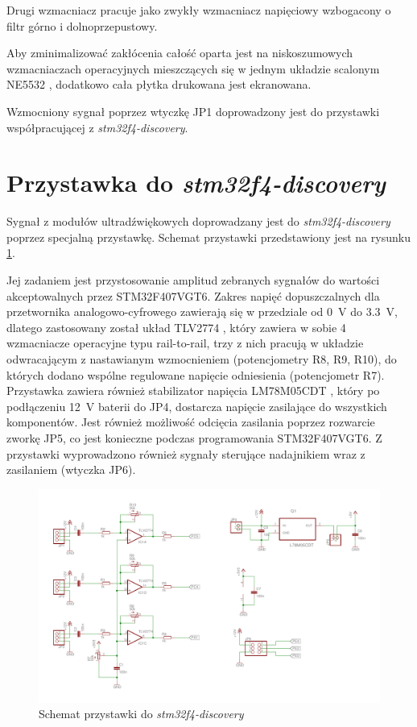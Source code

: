 Drugi wzmacniacz pracuje jako zwykły wzmacniacz napięciowy wzbogacony o filtr górno i dolnoprzepustowy.

Aby zminimalizować zakłócenia całość oparta jest na niskoszumowych wzmacniaczach operacyjnych
mieszczących się w jednym układzie scalonym NE5532 \cite{bib:ne5532}, 
dodatkowo cała płytka drukowana jest ekranowana.

Wzmocniony sygnał poprzez wtyczkę JP1 doprowadzony jest do przystawki współpracującej z \textit{stm32f4-discovery}.

\clearpage

\section{Przystawka do \textit{stm32f4-discovery}}

Sygnał z modułów ultradźwiękowych doprowadzany jest do \textit{stm32f4-discovery} poprzez specjalną przystawkę.
Schemat przystawki przedstawiony jest na rysunku \ref{fig:przystawka}.

Jej zadaniem jest przystosowanie amplitud zebranych sygnałów do wartości akceptowalnych przez STM32F407VGT6.
Zakres napięć dopuszczalnych dla przetwornika analogowo-cyfrowego zawierają się w przedziale od \SI{0}{V} do \SI{3,3}{V},
dlatego zastosowany został układ TLV2774 \cite{bib:TLV2774}, który zawiera w sobie 4 wzmacniacze operacyjne typu
rail-to-rail, trzy z nich pracują w układzie odwracającym z nastawianym wzmocnieniem (potencjometry R8, R9, R10), 
do których dodano wspólne regulowane napięcie odniesienia (potencjometr R7).
Przystawka zawiera również stabilizator napięcia LM78M05CDT \cite{bib:LM78M05CDT}, który po podłączeniu 
\SI{12}{V} baterii do JP4, dostarcza napięcie zasilające do wszystkich komponentów. 
Jest również możliwość odcięcia zasilania poprzez rozwarcie zworkę JP5, co jest konieczne podczas programowania
STM32F407VGT6.
Z przystawki wyprowadzono również sygnały sterujące nadajnikiem wraz z zasilaniem (wtyczka JP6).


 \begin{figure}[h!]
    \centering
    \includegraphics[width=1\textwidth, trim= 5mm 0mm 0mm 0mm,clip]{mainboard2}
    \caption{Schemat przystawki do \textit{stm32f4-discovery}}
    \label{fig:przystawka}
\end{figure}


